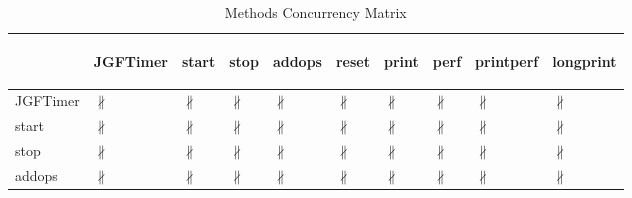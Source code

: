 \documentclass[10pt]{article}
\begin{document}
\begin{longtable}{|l|l|l|l|l|l|l|l|l|l|}
\caption{Methods Concurrency Matrix}\\
\hline
&\begin{sideways}JGFTimer\end{sideways}&\begin{sideways}start\end{sideways}&\begin{sideways}stop\end{sideways}&\begin{sideways}addops\end{sideways}&\begin{sideways}reset\end{sideways}&\begin{sideways}print\end{sideways}&\begin{sideways}perf\end{sideways}&\begin{sideways}printperf\end{sideways}&\begin{sideways}longprint\end{sideways}\\
\hline
JGFTimer&{\color{BrickRed}$\nparallel$}&{\color{BrickRed}$\nparallel$}&{\color{BrickRed}$\nparallel$}&{\color{BrickRed}$\nparallel$}&{\color{BrickRed}$\nparallel$}&{\color{BrickRed}$\nparallel$}&{\color{BrickRed}$\nparallel$}&{\color{BrickRed}$\nparallel$}&{\color{BrickRed}$\nparallel$}\\
\hline
start&{\color{BrickRed}$\nparallel$}&{\color{BrickRed}$\nparallel$}&{\color{BrickRed}$\nparallel$}&{\color{BrickRed}$\nparallel$}&{\color{BrickRed}$\nparallel$}&{\color{BrickRed}$\nparallel$}&{\color{BrickRed}$\nparallel$}&{\color{BrickRed}$\nparallel$}&{\color{BrickRed}$\nparallel$}\\
\hline
stop&{\color{BrickRed}$\nparallel$}&{\color{BrickRed}$\nparallel$}&{\color{BrickRed}$\nparallel$}&{\color{BrickRed}$\nparallel$}&{\color{BrickRed}$\nparallel$}&{\color{BrickRed}$\nparallel$}&{\color{BrickRed}$\nparallel$}&{\color{BrickRed}$\nparallel$}&{\color{BrickRed}$\nparallel$}\\
\hline
addops&{\color{BrickRed}$\nparallel$}&{\color{BrickRed}$\nparallel$}&{\color{BrickRed}$\nparallel$}&{\color{BrickRed}$\nparallel$}&{\color{BrickRed}$\nparallel$}&{\color{BrickRed}$\nparallel$}&{\color{BrickRed}$\nparallel$}&{\color{BrickRed}$\nparallel$}&{\color{BrickRed}$\nparallel$}\\

\end{longtable}
\end{document}
